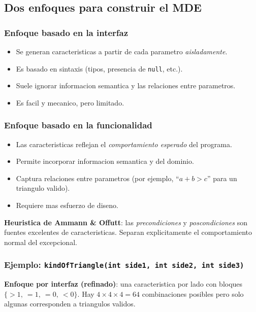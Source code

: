 \documentclass[12pt,a4paper]{article}
\begin{document}
\subsection{Dos enfoques para construir el MDE}

\subsubsection{Enfoque basado en la interfaz}

\begin{itemize}
  \item Se generan caracteristicas a partir de cada parametro \emph{aisladamente}.
  \item Es basado en sintaxis (tipos, presencia de \texttt{null}, etc.).
  \item Suele ignorar informacion semantica y las relaciones entre parametros.
  \item Es facil y mecanico, pero limitado.
\end{itemize}

\subsubsection{Enfoque basado en la funcionalidad}

\begin{itemize}
  \item Las caracteristicas reflejan el \emph{comportamiento esperado} del programa.
  \item Permite incorporar informacion semantica y del dominio.
  \item Captura relaciones entre parametros (por ejemplo, ``\(a+b > c\)'' para un triangulo
  valido).
  \item Requiere mas esfuerzo de diseno.
\end{itemize}

\begin{ideabox}
\textbf{Heuristica de Ammann \& Offutt}: las \emph{precondiciones} y \emph{poscondiciones} son
fuentes excelentes de caracteristicas. Separan explicitamente el comportamiento normal del
excepcional.
\end{ideabox}

\subsubsection{Ejemplo: \texttt{kindOfTriangle(int side1, int side2, int side3)}}

\textbf{Enfoque por interfaz (refinado)}: una caracteristica por lado con bloques
\(\{>1,\ =1,\ =0,\ <0\}\). Hay \(4 \times 4 \times 4 = 64\) combinaciones posibles pero solo
algunas corresponden a triangulos validos.
\end{document}
